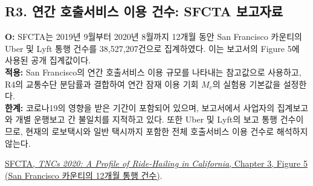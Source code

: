 \documentclass[10pt,a4paper]{article}
\begin{document}
\subsection*{\hypertarget{rationale-R3}{R3. 연간 호출서비스 이용 건수: SFCTA 보고자료}}
\noindent
\textbf{O:}
SFCTA는 2019년 9월부터 2020년 8월까지 12개월 동안
San Francisco 카운티의 Uber 및 Lyft 통행 건수를
38,527,207건으로 집계하였다.
이는 보고서의 Figure 5에 사용된 공개 집계값이다.\\
\textbf{적용:}
San Francisco의 연간 호출서비스 이용 규모를 나타내는
참고값으로 사용하고, R4의 교통수단 분담률과 결합하여
연간 잠재 이용 기회 $M_c$의 실험용 기본값을 설정한다.\\
\textbf{한계:}
코로나19의 영향을 받은 기간이 포함되어 있으며,
보고서에서 사업자의 집계보고와 개별 운행보고 간
불일치를 지적하고 있다.
또한 Uber 및 Lyft의 보고 통행 건수이므로,
현재의 로보택시와 일반 택시까지 포함한
전체 호출서비스 이용 건수로 해석하지 않는다.
\par \href{https://tncs2020.sfcta.org/ch3_general/}
{SFCTA, \textit{TNCs 2020: A Profile of Ride-Hailing
in California}, Chapter 3, Figure 5
(San Francisco 카운티의 12개월 통행 건수)}.

\end{document}
